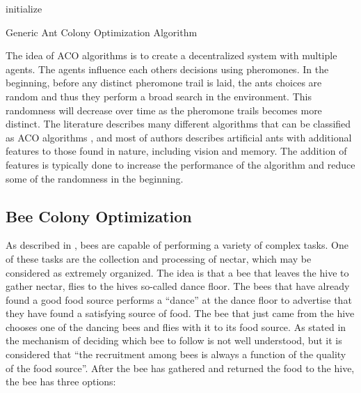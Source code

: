 \begin{algorithm}[H]
 initialize\;
 \caption{Generic Ant Colony Optimization Algorithm}
\end{algorithm}


The idea of ACO algorithms is to create a decentralized system with multiple agents. The agents influence each others decisions using pheromones. In the beginning, before any distinct pheromone trail is laid, the ants choices are random and thus they perform a broad search in the environment. This randomness will decrease over time as the pheromone trails becomes more distinct. The literature describes many different algorithms that can be classified as ACO algorithms \citep{salehi-nezhad07,tripathi09,jiang10, dias14}, and most of authors describes artificial ants with additional features to those found in nature, including vision and memory. The addition of features is typically done to increase the performance of the algorithm and reduce some of the randomness in the beginning.  


\subsection{Bee Colony Optimization}
As described in \citet{lucic03}, bees are capable of performing a variety of complex tasks. One of these tasks are the collection and processing of nectar, which may be considered as extremely organized. The idea is that a bee that leaves the hive to gather nectar, flies to the hives so-called dance floor. The bees that have already found a good food source performs a ``dance'' at the dance floor to advertise that they have found a satisfying source of food. The bee that just came from the hive chooses one of the dancing bees and flies with it to its food source. As stated in \citet{lucic03} the mechanism of deciding which bee to follow is not well understood, but it is considered that ``the recruitment among bees is always a function of the quality of the food source''. After the bee has gathered and returned the food to the hive, the bee has three options\citep{lucic03}:

